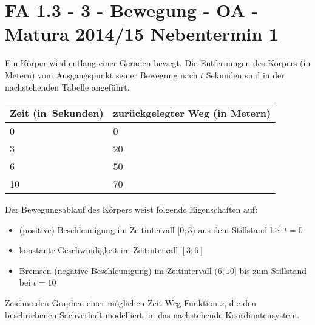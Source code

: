 \section{FA 1.3 - 3 - Bewegung - OA - Matura 2014/15 Nebentermin 1}

\begin{beispiel}[FA 1.3]{1} %
Ein Körper wird entlang einer Geraden bewegt. Die Entfernungen des Körpers (in Metern) vom Ausgangspunkt seiner Bewegung nach $t$ Sekunden sind in der nachstehenden Tabelle angeführt.

\begin{longtable}{|C{3cm}|C{3cm}|} \hline
{} Zeit \mbox{(in Sekunden)} &  zurückgelegter Weg (in Metern) \\  & 0 \\  &20 \\  & 50 \\  & 70 \\ \hline
\end{longtable}
\end{beispiel}

Der Bewegungsablauf des Körpers weist folgende Eigenschaften auf:
\begin{itemize}
	\item (positive) Beschleunigung im Zeitintervall $[0; 3)$ aus dem Stillstand bei $t = 0$
	\item konstante Geschwindigkeit im Zeitintervall $[3; 6]$
	\item Bremsen (negative Beschleunigung) im Zeitintervall $(6; 10]$ bis zum Stillstand bei $t = 10$
\end{itemize}

Zeichne den Graphen einer möglichen Zeit-Weg-Funktion $s$, die den beschriebenen Sachverhalt modelliert, in das nachstehende Koordinatensystem.\leer

